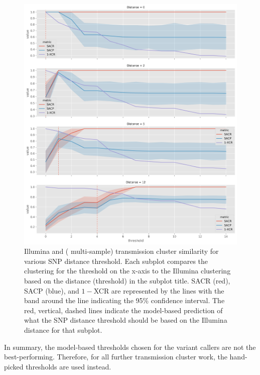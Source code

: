 \begin{figure}
\begin{center}
\includegraphics[width=0.90\columnwidth]{Appendix1/Figs/compare-threshold-sweep.png}
\caption{{Illumina and \ont{} (\pandora{} multi-sample) transmission cluster similarity for various SNP distance threshold. Each subplot compares the \ont{} clustering for the threshold on the x-axis to the Illumina clustering based on the distance (threshold) in the subplot title. SACR (red), SACP (blue), and $1-$XCR are represented by the lines with the band around the line indicating the 95\% confidence interval. The red, vertical, dashed lines indicate the model-based prediction of what the \ont{} SNP distance threshold should be based on the Illumina distance for that subplot.
{\label{fig:compare-dist-sweep}}%
}}
\end{center}
\end{figure}

\vspace{\baselineskip}
\noindent
In summary, the model-based thresholds chosen for the \ont{} variant callers are not the best-performing. Therefore, for all further transmission cluster work, the hand-picked thresholds are used instead.


